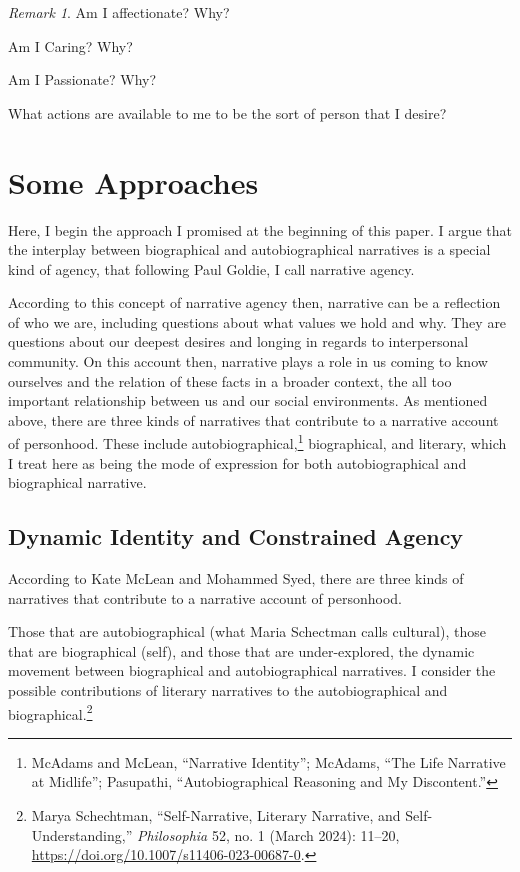 \documentclass[
  12pt,
]{book}
\theoremstyle{definition}
\theoremstyle{definition}
\theoremstyle{definition}
\theoremstyle{definition}
\theoremstyle{remark}
\newtheorem*{remark}{Remark}
\begin{document}
\begin{remark}
Am I affectionate? Why?

Am I Caring? Why?

Am I Passionate? Why?
\end{remark}

What actions are available to me to be the sort of person that I desire?

\section{Some Approaches}\label{some-approaches}

Here, I begin the approach I promised at the beginning of this paper. I argue that the interplay between biographical and autobiographical narratives is a special kind of agency, that following Paul Goldie, I call narrative agency.

According to this concept of narrative agency then, narrative can be a reflection of who we are, including questions about what values we hold and why. They are questions about our deepest desires and longing in regards to interpersonal community. On this account then, narrative plays a role in us coming to know ourselves and the relation of these facts in a broader context, the all too important relationship between us and our social environments. As mentioned above, there are three kinds of narratives that contribute to a narrative account of personhood. These include autobiographical,\footnote{McAdams and McLean, {``Narrative {Identity}''}; McAdams, {``The {Life Narrative} at {Midlife}''}; Pasupathi, {``Autobiographical {Reasoning} and {My} {Discontent}.''}} biographical, and literary, which I treat here as being the mode of expression for both autobiographical and biographical narrative.

\subsection{Dynamic Identity and Constrained Agency}\label{dynamic-identity-and-constrained-agency}

According to Kate McLean and Mohammed Syed, there are three kinds of narratives that contribute to a narrative account of personhood.

Those that are autobiographical (what Maria Schectman calls cultural), those that are biographical (self), and those that are under-explored, the dynamic movement between biographical and autobiographical narratives. I consider the possible contributions of literary narratives to the autobiographical and biographical.\footnote{Marya Schechtman, {``Self-{Narrative}, {Literary Narrative}, and {Self-Understanding},''} \emph{Philosophia} 52, no. 1 (March 2024): 11--20, \url{https://doi.org/10.1007/s11406-023-00687-0}.}
\end{document}
